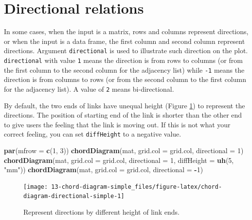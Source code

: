 \documentclass[]{book}
\newenvironment{Shaded}{\begin{snugshade}}{\end{snugshade}}
\newcommand{\KeywordTok}[1]{\textcolor[rgb]{0.13,0.29,0.53}{\textbf{#1}}}
\newcommand{\DataTypeTok}[1]{\textcolor[rgb]{0.13,0.29,0.53}{#1}}
\newcommand{\DecValTok}[1]{\textcolor[rgb]{0.00,0.00,0.81}{#1}}
\newcommand{\StringTok}[1]{\textcolor[rgb]{0.31,0.60,0.02}{#1}}
\newcommand{\OperatorTok}[1]{\textcolor[rgb]{0.81,0.36,0.00}{\textbf{#1}}}
\newcommand{\NormalTok}[1]{#1}
\begin{document}
\section{Directional relations}\label{directional-relations}

In some cases, when the input is a matrix, rows and columns represent
directions, or when the input is a data frame, the first column and
second column represent directions. Argument \texttt{directional} is
used to illustrate such direction on the plot. \texttt{directional} with
value \texttt{1} means the direction is from rows to columns (or from
the first column to the second column for the adjacency list) while
\texttt{-1} means the direction is from columns to rows (or from the
second column to the first column for the adjacency list). A value of
\texttt{2} means bi-directional.

By default, the two ends of links have unequal height (Figure
\ref{fig:chord-diagram-directional-simple}) to represent the directions.
The position of starting end of the link is shorter than the other end
to give users the feeling that the link is moving out. If this is not
what your correct feeling, you can set \texttt{diffHeight} to a negative
value.

\begin{Shaded}
\begin{Highlighting}[]
\KeywordTok{par}\NormalTok{(}\DataTypeTok{mfrow =} \KeywordTok{c}\NormalTok{(}\DecValTok{1}\NormalTok{, }\DecValTok{3}\NormalTok{))}
\KeywordTok{chordDiagram}\NormalTok{(mat, }\DataTypeTok{grid.col =}\NormalTok{ grid.col, }\DataTypeTok{directional =} \DecValTok{1}\NormalTok{)}
\KeywordTok{chordDiagram}\NormalTok{(mat, }\DataTypeTok{grid.col =}\NormalTok{ grid.col, }\DataTypeTok{directional =} \DecValTok{1}\NormalTok{, }\DataTypeTok{diffHeight =} \KeywordTok{uh}\NormalTok{(}\DecValTok{5}\NormalTok{, }\StringTok{"mm"}\NormalTok{))}
\KeywordTok{chordDiagram}\NormalTok{(mat, }\DataTypeTok{grid.col =}\NormalTok{ grid.col, }\DataTypeTok{directional =} \OperatorTok{-}\DecValTok{1}\NormalTok{)}
\end{Highlighting}
\end{Shaded}

\begin{figure}

{\centering \texttt{[image: 13-chord-diagram-simple\_files/figure-latex/chord-diagram-directional-simple-1]} 

}

\caption{Represent directions by different height of link ends.}\label{fig:chord-diagram-directional-simple}
\end{figure}
\end{document}
